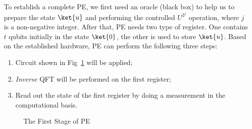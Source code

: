 To establish a complete PE, we first need an oracle (black box) to help us to prepare the state $\ket{u}$ and performing the controlled $U^{2^j}$ operation, where $j$ is a non-negative integer. After that, PE needs two type of register. One contains $t$ qubits initially in the state $\ket{0}$, the other is used to store $\ket{u}$. Based on the established hardware, PE can perform the following three steps:
\begin{enumerate}
    \item Circuit shown in Fig~\ref{fig:FirstStagePE} will be applied;
    \item \textit{Inverse} QFT will be performed on the first register;
    \item Read out the state of the first register by doing a measurement in the computational basis.
\end{enumerate}
\begin{figure}
    \centering
    \caption{The First Stage of PE}
    \label{fig:FirstStagePE}
\end{figure}
